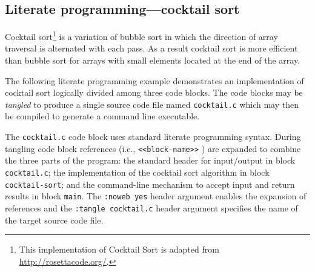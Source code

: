 \documentclass[article,shortnames]{jss}
\begin{document}
\subsection{Literate programming---cocktail sort}
\label{sec-4-2}

Cocktail sort\footnote{This implementation of Cocktail Sort is adapted
from \href{http://rosettacode.org/}{http://rosettacode.org/}. } is a variation of bubble sort in which
the direction of array traversal is alternated with each pass.  As a
result cocktail sort is more efficient than bubble sort for arrays
with small elements located at the end of the array.

The following literate programming example demonstrates an
implementation of cocktail sort logically divided among three code
blocks.  The code blocks may be \emph{tangled} to produce a single source
code file named \texttt{cocktail.c} which may then be compiled to generate a
command line executable.

The \texttt{cocktail.c} code block uses standard literate programming
syntax.  During tangling code block references
(i.e.,
  \verb=<<block-name>>=
) are expanded to combine the three parts of the program: the standard
 header for input/output in block \texttt{cocktail.c}; the implementation of
the cocktail sort algorithm in block \texttt{cocktail-sort}; and the
command-line mechanism to accept input and return results in block
\texttt{main}.  The \texttt{:noweb yes} header argument enables the expansion of
 references and the \texttt{:tangle cocktail.c} header argument
specifies the name of the target source code file.
\end{document}
